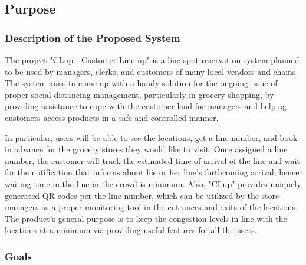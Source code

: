 \subsection{Purpose}

\subsubsection{Description of the Proposed System}
The project "CLup - Customer Line up" is a line spot reservation system planned to be used by managers, clerks, and customers of many local vendors and chains.
The system aims to come up with a handy solution for the ongoing issue of proper social distancing management, particularly in grocery shopping, by providing assistance to cope with the customer load for managers and helping customers access products in a safe and controlled manner.

In particular, users will be able to see the locations, get a line number, and book in advance for the grocery stores they would like to visit.
Once assigned a line number, the customer will track the estimated time of arrival of the line and wait for the notification that informs about his or her line's forthcoming arrival; hence waiting time in the line in the crowd is minimum.
Also, "CLup" provides uniquely generated QR codes per the line number, which can be utilized by the store managers as a proper monitoring tool in the entrances and exits of the locations.
The product's general purpose is to keep the congestion levels in line with the locations at a minimum via providing useful features for all the users.





\subsubsection{Goals}

